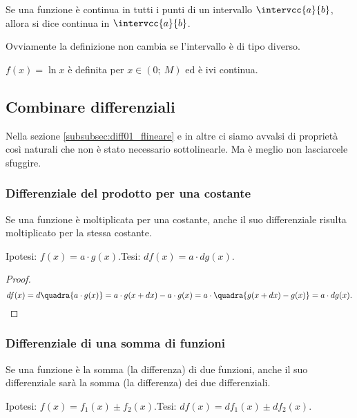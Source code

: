 \begin{definizione}
Se una funzione è continua in tutti i punti di un intervallo 
$\intervcc{a}{b}$, allora si dice continua in $\intervcc{a}{b}$.
\end{definizione}
\begin{osservazione}
 Ovviamente la definizione non cambia se l'intervallo è di tipo diverso.
\end{osservazione}

\begin{esempio}
 $f(x)=\ln x$ è definita per $x \in (0;\ M)$ ed è ivi continua.
\end{esempio}


\subsection{Combinare differenziali}
\label{subsec:diff01_combdiff}
Nella sezione \ref{subsubsec:diff01_flineare} e in altre ci siamo avvalsi 
di proprietà così naturali che non è stato necessario sottolinearle. 
Ma è meglio non lasciarcele sfuggire.

\subsubsection{Differenziale del prodotto per una costante}
\label{}
\begin{teorema}
 Se una funzione è moltiplicata per una costante, anche il suo 
 differenziale risulta moltiplicato per la stessa costante.
\end{teorema}
\noindent Ipotesi: $f(x)=a\cdot g(x)$.\tab Tesi: $df(x)=a\cdot dg(x)$.

\begin{proof}
\[
 df(x)=d\quadra{a\cdot g(x)}= a\cdot g(x+dx)-a\cdot 
g(x)=a\cdot\quadra{g(x+dx)-g(x)}
 =a\cdot dg(x).
\]
\end{proof}

\subsubsection{Differenziale di una somma di funzioni}
\label{}

\begin{teorema}
 Se una funzione è la somma (la differenza) di due funzioni, anche il suo 
 differenziale sarà la somma (la differenza) dei due differenziali.
\end{teorema}
\noindent Ipotesi: $f(x)=f_1(x)\pm f_2(x)$.\tab Tesi: $df(x)=df_1(x)\pm 
df_2(x)$.

